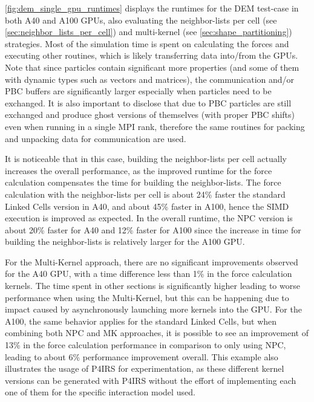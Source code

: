 \documentclass[preprint,12pt]{elsarticle}
\begin{document}
\autoref{fig:dem_single_gpu_runtimes} displays the runtimes for the DEM test-case in both A40 and A100 GPUs, also evaluating the neighbor-lists per cell (see \autoref{sec:neighbor_lists_per_cell}) and multi-kernel (see \autoref{sec:shape_partitioning}) strategies.
Most of the simulation time is spent on calculating the forces and executing other routines, which is likely transferring data into/from the GPUs.
Note that since particles contain significant more properties (and some of them with dynamic types such as vectors and matrices), the communication and/or PBC buffers are significantly larger especially when particles need to be exchanged.
It is also important to disclose that due to PBC particles are still exchanged and produce ghost versions of themselves (with proper PBC shifts) even when running in a single MPI rank, therefore the same routines for packing and unpacking data for communication are used.

It is noticeable that in this case, building the neighbor-lists per cell actually increases the overall performance, as the improved runtime for the force calculation compensates the time for building the neighbor-lists.
The force calculation with the neighbor-lists per cell is about 24\% faster the standard Linked Cells version in A40, and about 45\% faster in A100, hence the SIMD execution is improved as expected.
In the overall runtime, the NPC version is about 20\% faster for A40 and 12\% faster for A100 since the increase in time for building the neighbor-lists is relatively larger for the A100 GPU.

For the Multi-Kernel approach, there are no significant improvements observed for the A40 GPU, with a time difference less than 1\% in the force calculation kernels.
The time spent in other sections is significantly higher leading to worse performance when using the Multi-Kernel, but this can be happening due to impact caused by asynchronously launching more kernels into the GPU.
For the A100, the same behavior applies for the standard Linked Cells, but when combining both NPC and MK approaches, it is possible to see an improvement of 13\% in the force calculation performance in comparison to only using NPC, leading to about 6\% performance improvement overall.
This example also illustrates the usage of P4IRS for experimentation, as these different kernel versions can be generated with P4IRS without the effort of implementing each one of them for the specific interaction model used.
\end{document}
